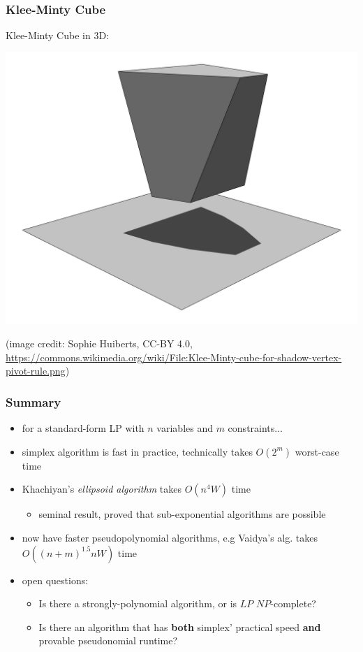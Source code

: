 \documentclass{beamer}
\begin{document}
\begin{frame} \frametitle{Klee-Minty Cube}
\begin{center}
  Klee-Minty Cube in 3D:

  \includegraphics[scale=.07]{Klee-Minty-cube-for-shadow-vertex-pivot-rule.png}

  {\tiny
  (image credit: Sophie Huiberts, CC-BY 4.0, \url{https://commons.wikimedia.org/wiki/File:Klee-Minty-cube-for-shadow-vertex-pivot-rule.png})
  }
\end{center}
\end{frame}

\begin{frame} \frametitle{Summary}
  \begin{itemize}
    \item for a standard-form LP with $n$ variables and $m$ constraints...
    \item simplex algorithm is fast in practice, technically takes $O(2^m)$
      worst-case time
    \item Khachiyan's \emph{ellipsoid algorithm} takes $O(n^4 W)$ time
      \begin{itemize}
        \item seminal result, proved that sub-exponential algorithms are possible
      \end{itemize}
    \item now have faster pseudopolynomial algorithms, e.g Vaidya's alg.
      takes $O((n+m)^{1.5} nW )$ time
    \item open questions:
    \begin{itemize}
      \item Is there a strongly-polynomial algorithm, or is
      $LP$ $NP$-complete?
      \item Is there an algorithm that has \textbf{both}
      simplex' practical speed \textbf{and} provable pseudonomial runtime?
    \end{itemize}
  \end{itemize}
\end{frame}
\end{document}
